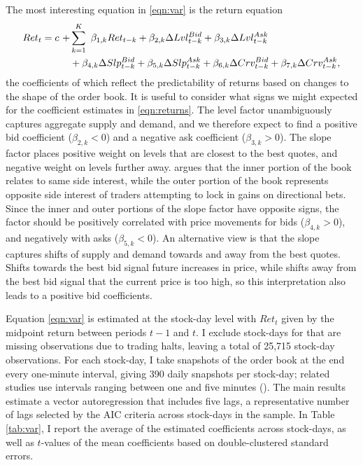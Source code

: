 	The most interesting equation in \eqref{eqn:var} is the return equation
	\begin{align}
	\label{eqn:returns}
	Ret_t = c \ + & \sum_{k=1}^{K} \ \beta_{1,k} Ret_{t-k} + \beta_{2, k} \Delta Lvl_{t-k}^{Bid} + \beta_{3, k} \Delta Lvl_{t-k}^{Ask} \notag \\
	& + \beta_{4, k} \Delta Slp_{t-k}^{Bid} + \beta_{5, k} \Delta Slp_{t-k}^{Ask} + \beta_{6, k}\Delta Crv_{t-k}^{Bid} + \beta_{7, k} \Delta Crv_{t-k}^{Ask},
	\end{align}
	the coefficients of which reflect the predictability of returns based on changes to the shape of the order book. It is useful to consider what signs we might expected for the coefficient estimates in \eqref{eqn:returns}. The level factor unambiguously captures aggregate supply and demand, and we therefore expect to find a positive bid coefficient ($\beta_{2, k} < 0$) and a negative ask coefficient ($\beta_{3, k} > 0$). The slope factor places positive weight on levels that are closest to the best quotes, and negative weight on levels further away. \citet{Yuferova2015} argues that the inner portion of the book relates to same side interest, while the outer portion of the book represents opposite side interest of traders attempting to lock in gains on directional bets. Since the inner and outer portions of the slope factor have opposite signs, the factor should be positively correlated with price movements for bids ($\beta_{4,k} > 0$), and negatively with asks ($\beta_{5,k} < 0$). An alternative view is that the slope captures shifts of supply and demand towards and away from the best quotes. Shifts towards the best bid signal future increases in price, while shifts away from the best bid signal that the current price is too high, so this interpretation also leads to a positive bid coefficients.

	Equation \eqref{eqn:var} is estimated at the stock-day level with $Ret_t$ given by the midpoint return between periods $t-1$ and $t$. I exclude stock-days for that are missing observations due to trading halts, leaving a total of 25,715 stock-day observations. For each stock-day, I take snapshots of the order book at the end every one-minute interval, giving 390 daily snapshots per stock-day; related studies use intervals ranging between one and five minutes (\citet{Yuferova2015,Cao2009}). The main results estimate a vector autoregression that includes five lags, a representative number of lags selected by the AIC criteria across stock-days in the sample. In Table \ref{tab:var}, I report the average of the estimated coefficients across stock-days, as well as $t$-values of the mean coefficients based on double-clustered standard errors.

